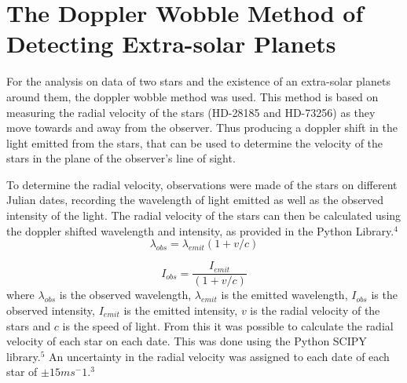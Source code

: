 \documentclass[]{article}
\begin{document}
\section*{The Doppler Wobble Method of Detecting Extra-solar Planets}
\par
For the analysis on data of two stars and the existence of an extra-solar planets 
around them, the doppler wobble method was used. This method is based on measuring the 
radial velocity of the stars (HD-28185 and HD-73256) as they move towards and away from 
the observer. Thus
producing a doppler shift in the light emitted from the stars, that can be used to 
determine the velocity of the stars in the plane of the observer's line of sight. 
\par
To determine the radial velocity, observations were made of the stars on different
Julian dates, recording the wavelength of light emitted as well as the observed intensity 
of the light. The radial velocity of the stars can then be calculated using the doppler
shifted wavelength and intensity, as provided in the Python Library.$^4$ 
\begin{equation}\label{eq:wavelength doppler}\lambda_{obs} = \lambda_{emit}{(1+v/c)}
\end{equation}

\begin{equation}\label{eq:intensity doppler}I_{obs} = \frac{I_{emit}}{(1+v/c)}
\end{equation}
where $\lambda_{obs}$ is the observed wavelength, $\lambda_{emit}$ is the 
emitted wavelength, $I_{obs}$ is the observed intensity, $I_{emit}$ is the emitted 
intensity, $v$ is the radial velocity of the stars and $c$ is the speed of light.
From this it was possible to calculate the radial velocity of each star on each date.
This was done using the Python SCIPY library.$^5$ An uncertainty in the radial velocity
was assigned to each date of each star of $\pm 15 ms^-1$.$^3$
\par
\end{document}
